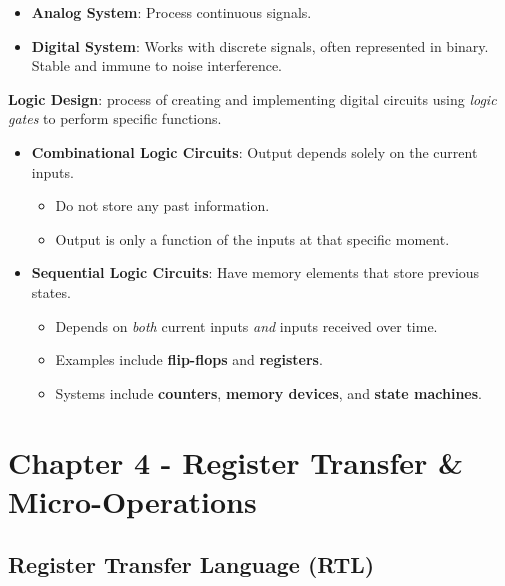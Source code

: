 \documentclass[12pt, letterpaper]{article}
\begin{document}
\begin{itemize}
    \item \textbf{Analog System}: Process continuous signals.
    \item \textbf{Digital System}: Works with discrete signals, often represented in binary. Stable and immune to noise interference.
\end{itemize}

\textbf{Logic Design}: process of creating and implementing digital circuits using \textit{logic gates} to perform specific functions.
\medskip

\begin{itemize}
    \item \textbf{Combinational Logic Circuits}: Output depends solely on the current inputs.
        \begin{itemize}
            \item Do not store any past information.
            \item Output is only a function of the inputs at that specific moment.
        \end{itemize}
    \item \textbf{Sequential Logic Circuits}: Have memory elements that store previous states.
        \begin{itemize}
            \item Depends on \textit{both} current inputs \textit{and} inputs received over time.
            \item Examples include \textbf{flip-flops} and \textbf{registers}.
            \item Systems include \textbf{counters}, \textbf{memory devices}, and \textbf{state machines}.
        \end{itemize}
\end{itemize}

\section*{Chapter 4 - Register Transfer \& Micro-Operations}

\subsection*{Register Transfer Language (RTL)}

\end{document}
